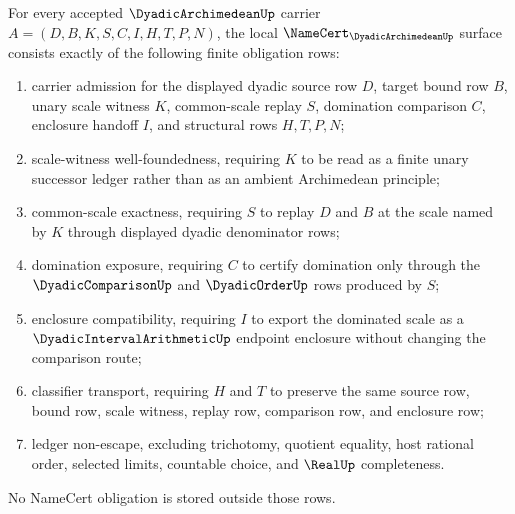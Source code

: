 \begin{theorem}
\label{thm:dyadic-archimedean-namecert-obligations}
For every accepted $\DyadicArchimedeanUp$ carrier $A=(D,B,K,S,C,I,H,T,P,N)$, the local $\NameCert_{\DyadicArchimedeanUp}$ surface consists exactly of the following finite obligation rows:
\begin{enumerate}
\item carrier admission for the displayed dyadic source row $D$, target bound row $B$, unary scale witness $K$, common-scale replay $S$, domination comparison $C$, enclosure handoff $I$, and structural rows $H,T,P,N$;
\item scale-witness well-foundedness, requiring $K$ to be read as a finite unary successor ledger rather than as an ambient Archimedean principle;
\item common-scale exactness, requiring $S$ to replay $D$ and $B$ at the scale named by $K$ through displayed dyadic denominator rows;
\item domination exposure, requiring $C$ to certify domination only through the $\DyadicComparisonUp$ and $\DyadicOrderUp$ rows produced by $S$;
\item enclosure compatibility, requiring $I$ to export the dominated scale as a $\DyadicIntervalArithmeticUp$ endpoint enclosure without changing the comparison route;
\item classifier transport, requiring $H$ and $T$ to preserve the same source row, bound row, scale witness, replay row, comparison row, and enclosure row;
\item ledger non-escape, excluding trichotomy, quotient equality, host rational order, selected limits, countable choice, and $\RealUp$ completeness.
\end{enumerate}
No NameCert obligation is stored outside those rows.
\end{theorem}
